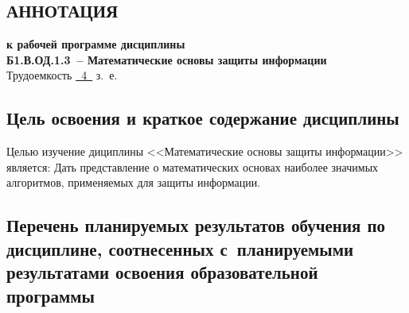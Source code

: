\documentclass[a4paper,12pt]{article}
\begin{document}
\newpage


\begin{center}
\section{АННОТАЦИЯ}
  {\bf к рабочей программе дисциплины\\
  Б1.В.ОД.1.3\ -- Математические основы защиты информации} \\
  Трудоемкость \uline{~4~} з.~е.
\end{center}


\subsection{Цель освоения и краткое содержание дисциплины}
  
  Целью изучение дициплины <<Математические основы защиты информации>> является: Дать представление о математических основах наиболее значимых алгоритмов, применяемых для защиты информации.
  


\subsection{Перечень планируемых результатов обучения по дисциплине, соотнесенных с~планируемыми результатами освоения образовательной программы}
\end{document}
